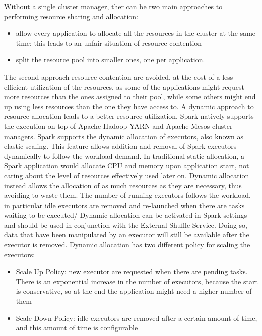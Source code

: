 Without a single cluster manager, ther can be two main approaches to performing resource sharing and allocation:
\begin{itemize}
	\item  allow every application to allocate all the resources in the cluster at the same time: this leads to an unfair situation of resource contention
	\item split the resource pool into smaller ones, one per application.
\end{itemize}
The second approach resource contention are avoided, at the cost of a less efficient utilization of the resources, as some of the applications might request more resources than the ones assigned to their pool, while some others might end up using less resources than the one they have access to.
A dynamic approach to resource allocation leads to a better resource utilization. Spark natively supports the execution on top of Apache Hadoop YARN and Apache Mesos cluster managers.
Spark supports the dynamic allocation of executors, also known as elastic scaling. This feature allows addition and removal of Spark executors dynamically to follow the workload demand.
In traditional static allocation, a Spark application would allocate CPU and memory upon application start, not caring about the level of resources effectively used later on. Dynamic allocation instead allows the allocation of as much resources as they are necessary, thus avoiding to waste them. The number of running executors follows the workload, in particular
idle executors are removed and re-launched when there are tasks waiting 
to be executed/ Dynamic allocation can be activated in Spark settings and should be used in conjunction with the External Shuffle Service.  Doing so, data that have been manipulated
by an executor will still be available after the executor is removed. 
Dynamic allocation has two different policy for scaling the executors:
\begin{itemize}
	\item Scale Up Policy: new executor are requested when there are pending tasks. There is an exponential increase in the number of executors, because the start is conservative, so at the end the application might need a higher number of them
	\item Scale Down Policy: idle executors are removed after a certain amount of time, and this amount of time is configurable
\end{itemize}

